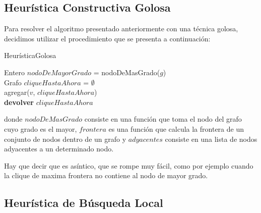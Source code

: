 \subsection{Heurística Constructiva Golosa}
Para resolver el algoritmo presentado anteriormente con una técnica golosa, decidimos utilizar el procedimiento que se presenta a continuación:\newline
\newline
\begin{algorithm}[H]
    \SetAlgoLined
    \caption{HeurísticaGolosa}
	Entero $nodoDeMayorGrado$ = nodoDeMasGrado($g$)\\
	Grafo $cliqueHastaAhora$ = $\emptyset$\\
	agregar($v$, $cliqueHastaAhora$)\\
\textbf{devolver} $cliqueHastaAhora$
\end{algorithm}

donde $nodoDeMasGrado$ consiste en una función que toma el nodo del grafo cuyo grado es el mayor, $frontera$ es una función que calcula la frontera de un conjunto de nodos dentro de un grafo y $adyacentes$ consiste en una lista de nodos adyacentes a un determinado nodo.\newline


Hay que decir que es asíntico, que se rompe muy fácil, como por ejemplo cuando la clique de maxima frontera no contiene al nodo de mayor grado.

\subsection{Heurística de Búsqueda Local}

